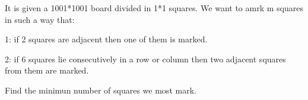 It is given a 1001*1001 board divided in 1*1 squares. We want to amrk m squares in such a way that:

1: if 2 squares are adjacent then one of them is marked.

2: if 6 squares lie consecutively in a row or column then two adjacent squares from them are marked.

Find the minimun number of squares we most mark.